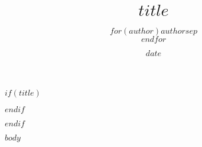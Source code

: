 \documentclass[UTF8]{beamer}
\title{$title$}
\author{$for(author)$$author$$sep$\\$endfor$}
\date{$date$}
\begin{document}
$if(title)$
\maketitle
$endif$


$endif$

$body$
\end{document}
